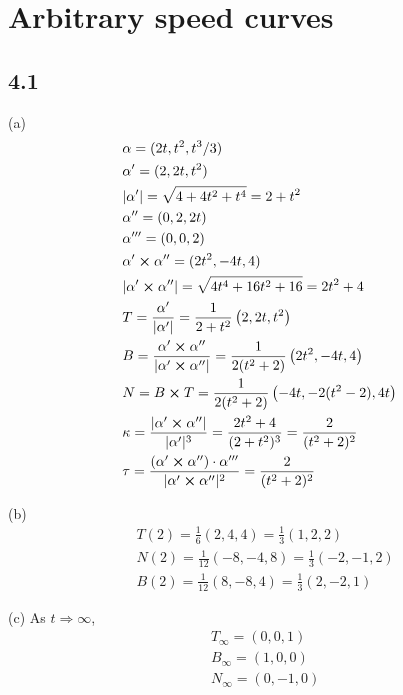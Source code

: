 \documentclass[12pt]{article}
\begin{document}
\section{Arbitrary speed curves}
\subsection*{4.1}
(a)
$$ \begin{aligned}
	&\alpha = (2t, t^2, t^3 / 3) \\
	&\alpha' = (2, 2t, t^2) \\
	& |\alpha'| = \sqrt{4+4t^2+t^4} = 2+t^2 \\
	&\alpha '' = (0, 2, 2t) \\
	&\alpha''' = (0, 0, 2) \\
	&\alpha' \cross \alpha'' = (2t^2, -4t, 4) \\
	&|\alpha' \cross \alpha''| = \sqrt{4t^4 + 16t^2 + 16} = 2t^2 + 4 \\
	& T = \frac{\alpha'}{|\alpha'|} = \frac{1}{2+t^2} \left(2, 2t, t^2\right) \\
	& B = \frac{\alpha' \cross \alpha''}{|\alpha' \cross \alpha''|} = \frac{1}{ 2(t^2 + 2) }\left(2t^2, -4t, 4\right) \\
	& N = B\cross T= \frac{1}{2(t^2+2)}\left(-4t, -2(t^2-2), 4t \right) \\
	& \kappa = \frac{|\alpha' \cross \alpha''|}{|\alpha'|^3} = \frac{2t^2+4}{(2+t^2)^3} = \frac{2}{(t^2+ 2)^2} \\
	& \tau = \frac{(\alpha' \cross \alpha'')\cdot \alpha'''}{|\alpha' \cross \alpha''|^2} = \frac{2}{(t^2+2)^2}
\end{aligned}$$

(b) $$\begin{aligned}
	&T(2) = \frac{1}{6}(2, 4, 4) = \frac{1}{3}(1, 2, 2) \\
	&N(2) = \frac{1}{12}(-8, -4, 8) = \frac{1}{3}(-2, -1, 2) \\
	&B(2) = \frac{1}{12}(8, -8, 4) = \frac{1}{3}(2, -2, 1)
\end{aligned}$$

(c) As $t \Rightarrow \infty$, $$ \begin{aligned}
	& T_{\infty} = (0, 0, 1) \\
	& B_{\infty} = (1, 0, 0) \\
	& N_{\infty} = (0, -1, 0) \\
\end{aligned}$$
\end{document}
